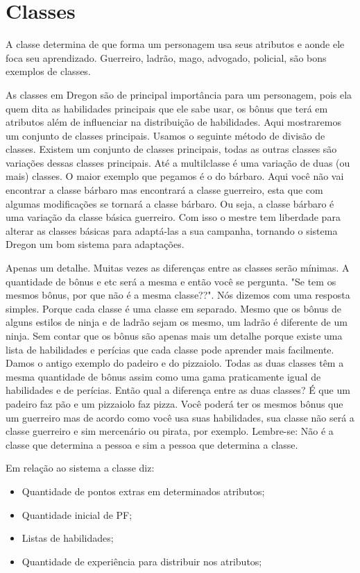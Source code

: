 
\chapter{Classes}
\label{Cap:classes}
A classe determina de que forma um personagem usa seus atributos e aonde ele foca seu aprendizado. Guerreiro, ladrão, mago, advogado, policial, são bons exemplos de classes.

As classes em Dregon são de principal importância para um personagem, pois ela quem dita as habilidades principais que ele sabe usar, os bônus que terá em atributos além de influenciar na distribuição de habilidades. Aqui mostraremos um conjunto de classes principais. Usamos o seguinte método de divisão de classes. Existem um conjunto de classes principais, todas as outras classes são variações dessas classes principais. Até a multilclasse é uma variação de duas (ou mais) classes. O maior exemplo que pegamos é o do bárbaro. Aqui você não vai encontrar a classe bárbaro mas encontrará a classe guerreiro, esta que com algumas modificações se tornará a classe bárbaro. Ou seja, a classe bárbaro é uma variação da classe básica guerreiro. Com isso o mestre tem liberdade para alterar as classes básicas para adaptá-las a sua campanha, tornando o sistema Dregon um bom sistema para adaptações.

Apenas um detalhe. Muitas vezes as diferenças entre as classes serão mínimas. A quantidade de bônus e etc será a mesma e então você se pergunta. "Se tem os mesmos bônus, por que não é a mesma classe??". Nós dizemos com uma resposta simples. Porque cada classe é uma classe em separado. Mesmo que os bônus de alguns estilos de ninja e de ladrão sejam os mesmo, um ladrão é diferente de um ninja. Sem contar que os bônus são apenas mais um detalhe porque existe uma lista de habilidades e perícias que cada classe pode aprender mais facilmente.
Damos o antigo exemplo do padeiro e do pizzaiolo. Todas as duas classes têm a mesma quantidade de bônus assim como uma gama praticamente igual de habilidades e de perícias. Então qual a diferença entre as duas classes? É que um padeiro faz pão e um pizzaiolo faz pizza. Você poderá ter os mesmos bônus que um guerreiro mas de acordo como você usa suas habilidades, sua classe não será a classe guerreiro e sim mercenário ou pirata, por exemplo. Lembre-se: Não é a classe que determina a pessoa e sim a pessoa que determina a classe.

Em relação ao sistema a classe diz:
\begin{itemize}
	\item Quantidade de pontos extras em determinados atributos;
	\item Quantidade inicial de PF;
	\item Listas de habilidades;
	\item Quantidade de experiência para distribuir nos atributos;
\end{itemize}


